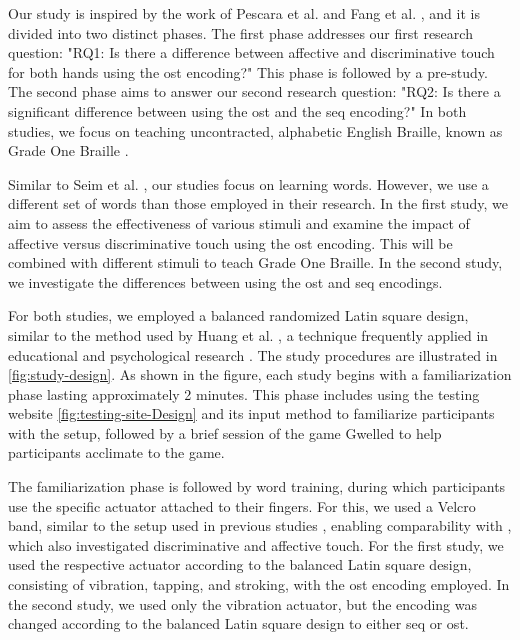 Our study is inspired by the work of Pescara et al. \cite{Pescara2019} and Fang et al. \cite{Fang2023}, and it is divided into two distinct phases. The first phase addresses our first research question: "RQ1: Is there a difference between affective and discriminative touch for both hands using the \gls{ost} encoding?" This phase is followed by a pre-study. The second phase aims to answer our second research question: "RQ2: Is there a significant difference between using the \gls{ost} and the \gls{seq} encoding?" In both studies, we focus on teaching uncontracted, alphabetic English Braille, known as Grade One Braille \cite{Troughton1992, Alnfiai2017}.

Similar to Seim et al. \cite{Seim2016, Seim2018}, our studies focus on learning words. However, we use a different set of words than those employed in their research. In the first study, we aim to assess the effectiveness of various stimuli and examine the impact of affective versus discriminative touch using the \gls{ost} encoding. This will be combined with different stimuli to teach Grade One Braille. In the second study, we investigate the differences between using the \gls{ost} and \gls{seq} encodings.

For both studies, we employed a balanced randomized Latin square design, similar to the method used by Huang et al. \cite{Huang2010}, a technique frequently applied in educational and psychological research \cite{Richardson2018}. The study procedures are illustrated in \autoref{fig:study-design}. As shown in the figure, each study begins with a familiarization phase lasting approximately 2 minutes. This phase includes using the testing website \autoref{fig:testing-site-Design} and its input method to familiarize participants with the setup, followed by a brief session of the game Gwelled to help participants acclimate to the game.

The familiarization phase is followed by word training, during which participants use the specific actuator attached to their fingers. For this, we used a Velcro band, similar to the setup used in previous studies \cite{Vaio6810, Fang2023}, enabling comparability with \cite{Fang2023}, which also investigated discriminative and affective touch. For the first study, we used the respective actuator according to the balanced Latin square design, consisting of vibration, tapping, and stroking, with the \gls{ost} encoding employed. In the second study, we used only the vibration actuator, but the encoding was changed according to the balanced Latin square design to either \gls{seq} or \gls{ost}.

